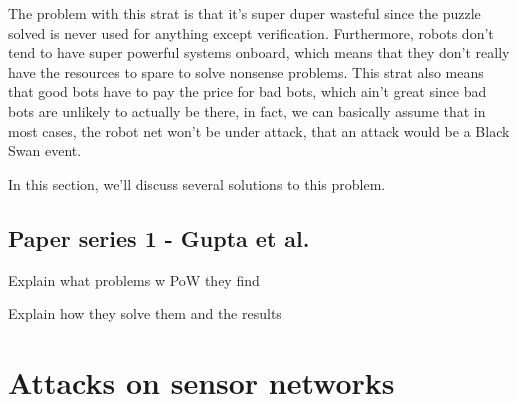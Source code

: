 The problem with this strat is that it's super duper wasteful since the puzzle solved is never used for anything except verification. Furthermore, robots don't tend to have super powerful systems onboard, which means that they don't really have the resources to spare to solve nonsense problems. This strat also means that good bots have to pay the price for bad bots, which ain't great since bad bots are unlikely to actually be there, in fact, we can basically assume that in most cases, the robot net won't be under attack, that an attack would be a Black Swan event.

In this section, we'll discuss several solutions to this problem.



\subsection{Paper series 1 - Gupta et al.}
Explain what problems w PoW they find

Explain how they solve them and the results





\section{Attacks on sensor networks}

